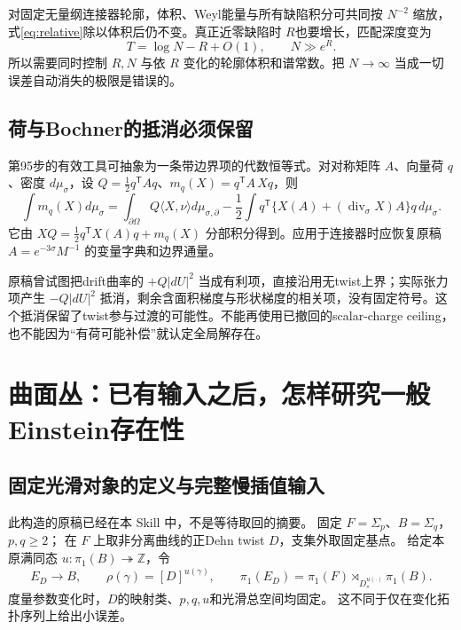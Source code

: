\documentclass[UTF8,a4paper,11pt,fontset=fandol]{ctexart}
\numberwithin{equation}{section}
\theoremstyle{definition}
\begin{document}
对固定无量纲连接器轮廓，体积、Weyl能量与所有缺陷积分可共同按 $N^{-2}$ 缩放，式\eqref{eq:relative}除以体积后仍不变。真正近零缺陷时 $R$也要增长，匹配深度变为
\begin{equation}\label{eq:RN}
T=\log N-R+O(1),\qquad N\gg e^R.
\end{equation}
所以需要同时控制 $R,N$ 与依 $R$ 变化的轮廓体积和谱常数。把 $N\to\infty$ 当成一切误差自动消失的极限是错误的。

\subsection{荷与Bochner的抵消必须保留}
第95步的有效工具可抽象为一条带边界项的代数恒等式。对对称矩阵 $A$、向量荷 $q$、密度 $d\mu_\sigma$，设 $Q=\frac12q^{\mathsf T}Aq$、$m_q(X)=q^{\mathsf T}A\,Xq$，则
\begin{equation}\label{eq:charge}
\int m_q(X)d\mu_\sigma=
\int_{\partial\Omega}Q\langle X,\nu\rangle d\mu_{\sigma,\partial}
-\frac12\int q^{\mathsf T}\{X(A)+(\operatorname{div}_\sigma X)A\}q\,d\mu_\sigma.
\end{equation}
它由 $XQ=\frac12q^{\mathsf T}X(A)q+m_q(X)$ 分部积分得到。应用于连接器时应恢复原稿 $A=e^{-3\sigma}M^{-1}$ 的变量字典和边界通量。

原稿曾试图把drift曲率的 $+Q|dU|^2$ 当成有利项，直接沿用无twist上界；实际张力项产生 $-Q|dU|^2$ 抵消，剩余含面积梯度与形状梯度的相关项，没有固定符号。这个抵消保留了twist参与过渡的可能性。不能再使用已撤回的scalar-charge ceiling，也不能因为“有荷可能补偿”就认定全局解存在。

\section{曲面丛：已有输入之后，怎样研究一般Einstein存在性}
\subsection{固定光滑对象的定义与完整慢插值输入}
此构造的原稿已经在本 Skill 中，不是等待取回的摘要。
固定 $F=\Sigma_p$、$B=\Sigma_q$，$p,q\ge2$；
在 $F$ 上取非分离曲线的正Dehn twist $D$，支集外取固定基点。
给定本原满同态 $u:\pi_1(B)\twoheadrightarrow\mathbb Z$，令
\[
 E_D\longrightarrow B,\qquad
 \rho(\gamma)=[D]^{u(\gamma)},\qquad
 \pi_1(E_D)=\pi_1(F)\rtimes_{D_*^{u(\cdot)}}\pi_1(B).
\]
度量参数变化时，$D$的映射类、$p,q,u$和光滑总空间均固定。
这不同于仅在变化拓扑序列上给出小误差。
\end{document}
